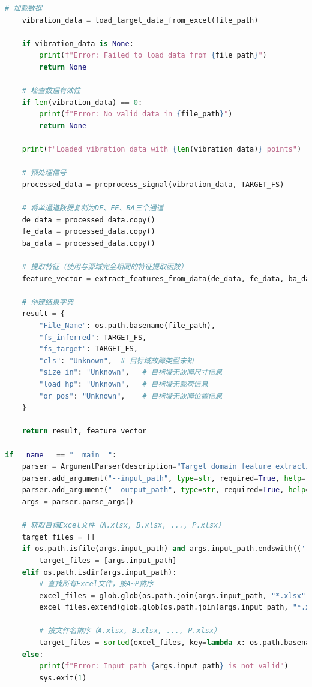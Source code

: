\documentclass[a4paper]{CPIPC}
\numberwithin{equation}{section}
\begin{document}
\begin{lstlisting}[language=Python, caption=Target Domain Feature Extraction]
    # 加载数据
    vibration_data = load_target_data_from_excel(file_path)
    
    if vibration_data is None:
        print(f"Error: Failed to load data from {file_path}")
        return None
    
    # 检查数据有效性
    if len(vibration_data) == 0:
        print(f"Error: No valid data in {file_path}")
        return None
    
    print(f"Loaded vibration data with {len(vibration_data)} points")
    
    # 预处理信号
    processed_data = preprocess_signal(vibration_data, TARGET_FS)
    
    # 将单通道数据复制为DE、FE、BA三个通道
    de_data = processed_data.copy()
    fe_data = processed_data.copy()  
    ba_data = processed_data.copy()
    
    # 提取特征（使用与源域完全相同的特征提取函数）
    feature_vector = extract_features_from_data(de_data, fe_data, ba_data, TARGET_RPM, TARGET_FS)
    
    # 创建结果字典
    result = {
        "File_Name": os.path.basename(file_path),
        "fs_inferred": TARGET_FS,
        "fs_target": TARGET_FS,
        "cls": "Unknown",  # 目标域故障类型未知
        "size_in": "Unknown",   # 目标域无故障尺寸信息
        "load_hp": "Unknown",   # 目标域无载荷信息
        "or_pos": "Unknown",    # 目标域无故障位置信息
    }
    
    return result, feature_vector

if __name__ == "__main__":
    parser = ArgumentParser(description="Target domain feature extraction with same features as source domain")
    parser.add_argument("--input_path", type=str, required=True, help="Path to target Excel files or directory")
    parser.add_argument("--output_path", type=str, required=True, help="Output CSV file path")
    args = parser.parse_args()
    
    # 获取目标Excel文件（A.xlsx, B.xlsx, ..., P.xlsx）
    target_files = []
    if os.path.isfile(args.input_path) and args.input_path.endswith(('.xlsx', '.xls')):
        target_files = [args.input_path]
    elif os.path.isdir(args.input_path):
        # 查找所有Excel文件，按A~P排序
        excel_files = glob.glob(os.path.join(args.input_path, "*.xlsx"))
        excel_files.extend(glob.glob(os.path.join(args.input_path, "*.xls")))
        
        # 按文件名排序（A.xlsx, B.xlsx, ..., P.xlsx）
        target_files = sorted(excel_files, key=lambda x: os.path.basename(x))
    else:
        print(f"Error: Input path {args.input_path} is not valid")
        sys.exit(1)
    

\end{lstlisting}
\end{document}
